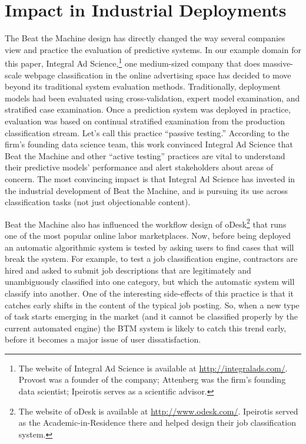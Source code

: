 \section{Impact in Industrial Deployments}
\label{sec:impact}

The Beat the Machine design has directly changed the way several companies view and practice the evaluation of predictive systems.  In our example domain for this paper, Integral Ad Science,\footnote{The website of Integral Ad Science is available at \url{http://integralads.com/}. Provost was a founder of the company; Attenberg was the firm's founding data scientist; Ipeirotis serves as a scientific advisor.} one medium-sized company that does massive-scale webpage classification in the online advertising space has decided to move beyond its traditional system evaluation methods.  Traditionally, deployment models had been evaluated using cross-validation, expert model examination, and stratified case examination.  Once a prediction system was deployed in practice, evaluation was based on continual stratified examination from the production classification stream.  Let's call this practice ``passive testing.'' 
According to the firm's founding data science team, this work convinced Integral Ad Science that Beat the Machine and other ``active testing'' practices are vital to understand their predictive models' performance and alert stakeholders about areas of concern.  The most convincing impact is that Integral Ad Science has invested in the industrial development of Beat the Machine, and is pursuing its use across classification tasks (not just objectionable content). 

Beat the Machine also has influenced the workflow design of oDesk\footnote{The website of oDesk is available at \url{http://www.odesk.com/}. Ipeirotis served as the Academic-in-Residence there and helped design their job classification system.} that runs one of the most popular online labor marketplaces.  Now, before being deployed an automatic algorithmic system is tested by asking users to find cases that will break the system. For example, to test a job classification engine, contractors are hired and asked to submit job descriptions that are legitimately and unambiguously classified into one category, but which the automatic system will classify into another. One of the interesting side-effects of this practice is that it catches early shifts in the content of the typical job posting.  So, when a new type of task starts emerging in the market (and it cannot be classified properly by the current automated engine) the BTM system is likely to catch this trend early, before it becomes a major issue of user dissatisfaction.

